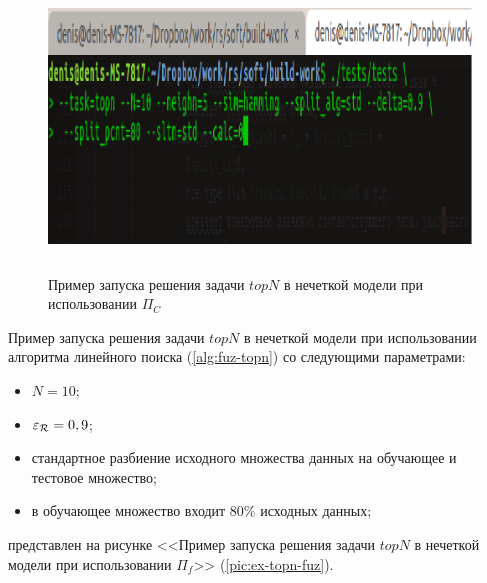 \begin{figure}[H]
	\caption{Пример запуска решения задачи $topN$ в нечеткой модели при
	использовании $\Pi_C$}
	\label{pic:ex-topn-hamming}
	\begin{center}
  \includegraphics[width=7in,height=3in]{pics/examples/topn-hamming.png}
\end{center}
\end{figure}

Пример запуска решения задачи $topN$ в нечеткой модели
при использовании алгоритма линейного поиска (\ref{alg:fuz-topn}) со следующими
параметрами:
\begin{itemize}
	\item $N=10$;
	\item $\varepsilon_{\mathcal{R}} = 0,9$;
	\item стандартное разбиение исходного множества данных на обучающее и
		тестовое множество;
	\item в обучающее множество входит 80\% исходных данных;
\end{itemize}
представлен на рисунке <<Пример запуска решения задачи $topN$ в нечеткой модели при
	использовании $\Pi_f$>> (\ref{pic:ex-topn-fuz}).

